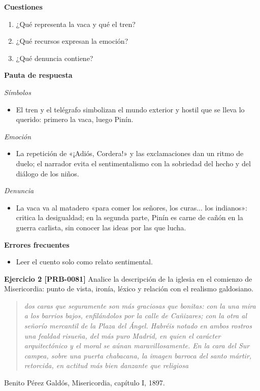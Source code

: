 \documentclass{book}
\begin{document}
\noindent\textbf{Cuestiones}
\begin{enumerate}
\item ¿Qué representa la vaca y qué el tren?
\item ¿Qué recursos expresan la emoción?
\item ¿Qué denuncia contiene?
\end{enumerate}

\noindent\textbf{Pauta de respuesta}

\noindent\textit{Símbolos}
\begin{itemize}
\item El tren y el telégrafo simbolizan el mundo exterior y hostil que se lleva lo querido: primero la vaca, luego Pinín.
\end{itemize}

\noindent\textit{Emoción}
\begin{itemize}
\item La repetición de «¡Adiós, Cordera!» y las exclamaciones dan un ritmo de duelo; el narrador evita el sentimentalismo con la sobriedad del hecho y del diálogo de los niños.
\end{itemize}

\noindent\textit{Denuncia}
\begin{itemize}
\item La vaca va al matadero «para comer los señores, los curas... los indianos»: critica la desigualdad; en la segunda parte, Pinín es carne de cañón en la guerra carlista, sin conocer las ideas por las que lucha.
\end{itemize}

\noindent\textbf{Errores frecuentes}
\begin{itemize}
\item Leer el cuento solo como relato sentimental.
\end{itemize}

\noindent\textbf{Ejercicio 2 [PRB-0081]}
Analice la descripción de la iglesia en el comienzo de Misericordia: punto de vista, ironía, léxico y relación con el realismo galdosiano.


\begin{quote}
\itshape dos caras que seguramente son más graciosas que bonitas: con la una mira a los barrios bajos, enfilándolos por la calle de Cañizares; con la otra al señorío mercantil de la Plaza del Ángel. Habréis notado en ambos rostros una fealdad risueña, del más puro Madrid, en quien el carácter arquitectónico y el moral se aúnan maravillosamente. En la cara del Sur campea, sobre una puerta chabacana, la imagen barroca del santo mártir, retorcida, en actitud más bien danzante que religiosa
\end{quote}
{\noindent\footnotesize Benito Pérez Galdós, Misericordia, capítulo I, 1897.\par}
\end{document}

